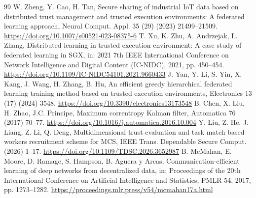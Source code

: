 \documentclass[final,5p,times,twocolumn]{elsarticle/elsarticle}
\begin{document}
\begin{thebibliography}{99}
     W. Zheng, Y. Cao, H. Tan, Secure sharing of industrial IoT data based on distributed trust management and trusted execution environments: A federated learning approach, Neural Comput. Appl. 35 (29) (2023) 21499--21509. \url{https://doi.org/10.1007/s00521-023-08375-6}
     T. Xu, K. Zhu, A. Andrzejak, L. Zhang, Distributed learning in trusted execution environment: A case study of federated learning in SGX, in: 2021 7th IEEE International Conference on Network Intelligence and Digital Content (IC-NIDC), 2021, pp. 450--454. \url{https://doi.org/10.1109/IC-NIDC54101.2021.9660433}
     J. Yan, Y. Li, S. Yin, X. Kang, J. Wang, H. Zhang, B. Hu, An efficient greedy hierarchical federated learning training method based on trusted execution environments, Electronics 13 (17) (2024) 3548. \url{https://doi.org/10.3390/electronics13173548}
     B. Chen, X. Liu, H. Zhao, J.C. Principe, Maximum correntropy Kalman filter, Automatica 76 (2017) 70--77. \url{https://doi.org/10.1016/j.automatica.2016.10.004}
     Y. Liu, Z. He, J. Liang, Z. Li, Q. Deng, Multidimensional trust evaluation and task match based workers recruitment scheme for MCS, IEEE Trans. Dependable Secure Comput. (2026) 1--17. \url{https://doi.org/10.1109/TDSC.2026.3652987}
     B. McMahan, E. Moore, D. Ramage, S. Hampson, B. Aguera y Arcas, Communication-efficient learning of deep networks from decentralized data, in: Proceedings of the 20th International Conference on Artificial Intelligence and Statistics, PMLR 54, 2017, pp. 1273--1282. \url{https://proceedings.mlr.press/v54/mcmahan17a.html}

\end{thebibliography}
\end{document}
